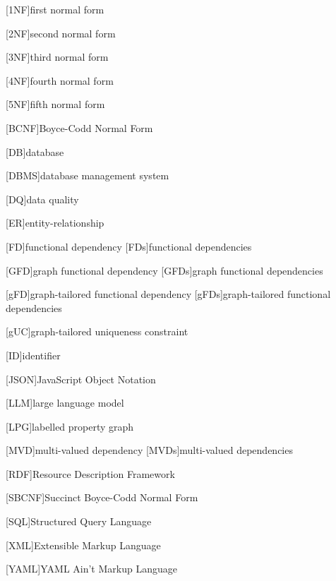 \begin{acronym}

[1NF]{first normal form}

[2NF]{second normal form}

[3NF]{third normal form}

[4NF]{fourth normal form}

[5NF]{fifth normal form}

[BCNF]{Boyce-Codd Normal Form}

[DB]{database}

[DBMS]{database management system}

[DQ]{data quality}

[ER]{entity-relationship}

[FD]{functional dependency}
[FDs]{functional dependencies}

[GFD]{graph functional dependency}
[GFDs]{graph functional dependencies}

[gFD]{graph-tailored functional dependency}
[gFDs]{graph-tailored functional dependencies}

[gUC]{graph-tailored uniqueness constraint}

[ID]{identifier}

[JSON]{JavaScript Object Notation}

[LLM]{large language model}

[LPG]{labelled property graph}

[MVD]{multi-valued dependency}
[MVDs]{multi-valued dependencies}

[RDF]{Resource Description Framework}

[SBCNF]{Succinct Boyce-Codd Normal Form} %

[SQL]{Structured Query Language}

[XML]{Extensible Markup Language}

[YAML]{YAML Ain't Markup Language}

\end{acronym}
